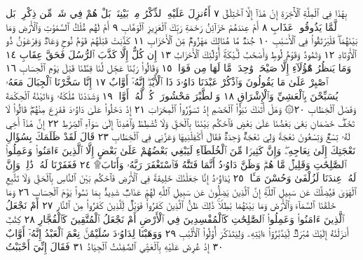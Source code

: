 بِهَٰذَا فِي ٱلْمِلَّةِ ٱلْأٓخِرَةِ إِنْ هَٰذَآ إِلَّا ٱخْتِلَٰقٌ ٧ أَءُنزِلَ عَلَيْهِ ٱلذِّكْرُ
مِنۢ بَيْنِنَاۚ بَلْ هُمْ فِي شَكࣲّ مِّن ذِكْرِيۚ بَل لَّمَّا يَذُوقُوا۟ عَذَابِ ٨ أَمْ عِندَهُمْ
خَزَآئِنُ رَحْمَةِ رَبِّكَ ٱلْعَزِيزِ ٱلْوَهَّابِ ٩ أَمْ لَهُم مُّلْكُ ٱلسَّمَٰوَٰتِ وَٱلْأَرْضِ
وَمَا بَيْنَهُمَاۖ فَلْيَرْتَقُوا۟ فِي ٱلْأَسْبَٰبِ ١٠ جُندࣱ مَّا هُنَالِكَ مَهْزُومࣱ مِّنَ
ٱلْأَحْزَابِ ١١ كَذَّبَتْ قَبْلَهُمْ قَوْمُ نُوحࣲ وَعَادࣱ وَفِرْعَوْنُ ذُو ٱلْأَوْتَادِ ١٢
وَثَمُودُ وَقَوْمُ لُوطࣲ وَأَصْحَٰبُ لْـَٔيْكَةِۚ أُو۟لَٰٓئِكَ ٱلْأَحْزَابُ ١٣ إِن كُلٌّ إِلَّا
كَذَّبَ ٱلرُّسُلَ فَحَقَّ عِقَابِ ١٤ وَمَا يَنظُرُ هَٰٓؤُلَآءِ إِلَّا صَيْحَةࣰ وَٰحِدَةࣰ
مَّا لَهَا مِن فَوَاقࣲ ١٥ وَقَالُوا۟ رَبَّنَا عَجِّل لَّنَا قِطَّنَا قَبْلَ يَوْمِ ٱلْحِسَابِ ١٦
ٱصْبِرْ عَلَىٰ مَا يَقُولُونَ وَٱذْكُرْ عَبْدَنَا دَاوُۥدَ ذَا ٱلْأَيْدِۖ إِنَّهُۥٓ أَوَّابٌ ١٧ إِنَّا
سَخَّرْنَا ٱلْجِبَالَ مَعَهُۥ يُسَبِّحْنَ بِٱلْعَشِيِّ وَٱلْإِشْرَاقِ ١٨ وَٱلطَّيْرَ
مَحْشُورَةࣰۖ كُلࣱّ لَّهُۥٓ أَوَّابࣱ ١٩ وَشَدَدْنَا مُلْكَهُۥ وَءَاتَيْنَٰهُ ٱلْحِكْمَةَ
وَفَصْلَ ٱلْخِطَابِ ٢٠۞ وَهَلْ أَتَىٰكَ نَبَؤُا۟ ٱلْخَصْمِ إِذْ تَسَوَّرُوا۟
ٱلْمِحْرَابَ ٢١ إِذْ دَخَلُوا۟ عَلَىٰ دَاوُۥدَ فَفَزِعَ مِنْهُمْۖ قَالُوا۟ لَا تَخَفْۖ
خَصْمَانِ بَغَىٰ بَعْضُنَا عَلَىٰ بَعْضࣲ فَٱحْكُم بَيْنَنَا بِٱلْحَقِّ وَلَا تُشْطِطْ
وَٱهْدِنَآ إِلَىٰ سَوَآءِ ٱلصِّرَٰطِ ٢٢ إِنَّ هَٰذَآ أَخِي لَهُۥ تِسْعࣱ وَتِسْعُونَ نَعْجَةࣰ
وَلِيَ نَعْجَةࣱ وَٰحِدَةࣱ فَقَالَ أَكْفِلْنِيهَا وَعَزَّنِي فِي ٱلْخِطَابِ ٢٣ قَالَ
لَقَدْ ظَلَمَكَ بِسُؤَالِ نَعْجَتِكَ إِلَىٰ نِعَاجِهِۦۖ وَإِنَّ كَثِيرࣰا مِّنَ ٱلْخُلَطَآءِ لَيَبْغِي
بَعْضُهُمْ عَلَىٰ بَعْضٍ إِلَّا ٱلَّذِينَ ءَامَنُوا۟ وَعَمِلُوا۟ ٱلصَّٰلِحَٰتِ وَقَلِيلࣱ مَّا هُمْۗ
وَظَنَّ دَاوُۥدُ أَنَّمَا فَتَنَّٰهُ فَٱسْتَغْفَرَ رَبَّهُۥ  وَأَنَابَ۩ ٢٤
فَغَفَرْنَا لَهُۥ ذَٰلِكَۖ وَإِنَّ لَهُۥ عِندَنَا لَزُلْفَىٰ وَحُسْنَ مَـَٔابࣲ ٢٥
يَٰدَاوُۥدُ إِنَّا جَعَلْنَٰكَ خَلِيفَةࣰ فِي ٱلْأَرْضِ فَٱحْكُم بَيْنَ ٱلنَّاسِ بِٱلْحَقِّ
وَلَا تَتَّبِعِ ٱلْهَوَىٰ فَيُضِلَّكَ عَن سَبِيلِ ٱللَّهِۚ إِنَّ ٱلَّذِينَ يَضِلُّونَ
عَن سَبِيلِ ٱللَّهِ لَهُمْ عَذَابࣱ شَدِيدُۢ بِمَا نَسُوا۟ يَوْمَ ٱلْحِسَابِ ٢٦
وَمَا خَلَقْنَا ٱلسَّمَآءَ وَٱلْأَرْضَ وَمَا بَيْنَهُمَا بَٰطِلࣰاۚ ذَٰلِكَ ظَنُّ ٱلَّذِينَ
كَفَرُوا۟ۚ فَوَيْلࣱ لِّلَّذِينَ كَفَرُوا۟ مِنَ ٱلنَّارِ ٢٧ أَمْ نَجْعَلُ ٱلَّذِينَ ءَامَنُوا۟ وَعَمِلُوا۟
ٱلصَّٰلِحَٰتِ كَٱلْمُفْسِدِينَ فِي ٱلْأَرْضِ أَمْ نَجْعَلُ ٱلْمُتَّقِينَ كَٱلْفُجَّارِ ٢٨
كِتَٰبٌ أَنزَلْنَٰهُ إِلَيْكَ مُبَٰرَكࣱ لِّيَدَّبَّرُوٓا۟ ءَايَٰتِهِۦ وَلِيَتَذَكَّرَ أُو۟لُوا۟
ٱلْأَلْبَٰبِ ٢٩ وَوَهَبْنَا لِدَاوُۥدَ سُلَيْمَٰنَۚ نِعْمَ ٱلْعَبْدُ إِنَّهُۥٓ أَوَّابٌ ٣٠
إِذْ عُرِضَ عَلَيْهِ بِٱلْعَشِيِّ ٱلصَّٰفِنَٰتُ ٱلْجِيَادُ ٣١ فَقَالَ إِنِّيٓ أَحْبَبْتُ
